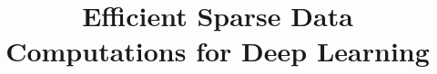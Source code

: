 \documentclass{sig-alternate}
\begin{document}
\title{Efficient Sparse Data Computations for Deep Learning}
\date{}
\maketitle
\thispagestyle{firstpage}
\pagestyle{plain}






%
%










\end{document}

